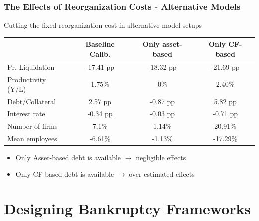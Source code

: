 \documentclass[aspectratio=169,xcolor=table]{beamer}
\begin{document}
\begin{frame}[label=Aggeffects] \frametitle{The Effects of Reorganization Costs - Alternative Models \hfill  \hyperlink{liqrisk}{}}

Cutting the fixed reorganization cost in alternative model setups

\small
\begin{table}[H]
    \centering
    \renewcommand{\arraystretch}{0.85}
    \begin{tabular}{lccc}
    & \textbf{Baseline Calib.} & \textbf{Only asset-based} & \textbf{Only CF-based} \\    
    \toprule
    \rowcolor{blue!10} Pr. Liquidation & -17.41 pp & -18.32 pp & -21.69 pp \\  
    \rowcolor{blue!10} Productivity (Y/L) & 1.75\% & 0\% & 2.40\% \vspace{2mm} \\  

    Debt/Collateral & 2.57 pp & -0.87 pp & 5.82 pp \\  
    Interest rate & -0.34 pp & -0.03 pp & -0.71 pp \\  
    Number of firms & 7.1\% & 1.14\% & 20.91\% \\  
    Mean employees & -6.61\% & -1.13\% & -17.29\% \\  
    \bottomrule
    \end{tabular}
    \label{tab:percentage_changes}
\end{table}
\normalsize

\begin{itemize} 
    \item Only Asset-based debt is available $\rightarrow$ negligible effects
    \item Only CF-based debt is available $\rightarrow$ over-estimated effects
\end{itemize} 


\end{frame}


\section{Designing Bankruptcy Frameworks}
\end{document}
